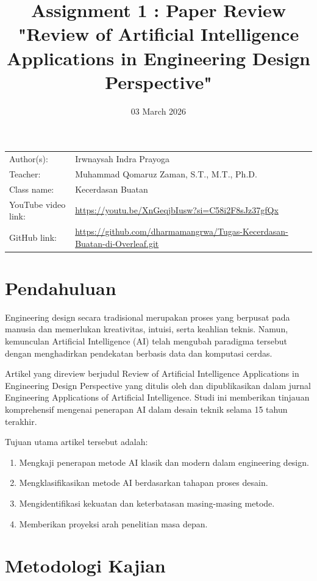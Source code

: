 \documentclass{article}
\title{Assignment 1 : Paper Review "Review of Artificial Intelligence Applications in Engineering Design Perspective"}
\date{03 March 2026}
\begin{document}
\maketitle


\noindent\begin{tabular}{@{}ll}
    Author(s): & Irwnaysah Indra Prayoga\\
     Teacher: &  Muhammad Qomaruz Zaman, S.T., M.T., Ph.D.\\
     Class name: & Kecerdasan Buatan\\
     YouTube video link: & \url{https://youtu.be/XnGeqjbIusw?si=C58i2F8sJz37gfQx} \\
     GitHub link: & \url{https://github.com/dharmamangrwa/Tugas-Kecerdasan-Buatan-di-Overleaf.git}
\end{tabular}
\vspace{2cm}

\section*{Pendahuluan}

Engineering design secara tradisional merupakan proses yang berpusat pada manusia dan memerlukan kreativitas, intuisi, serta keahlian teknis. Namun, kemunculan Artificial Intelligence (AI) telah mengubah paradigma tersebut dengan menghadirkan pendekatan berbasis data dan komputasi cerdas.

Artikel yang direview berjudul Review of Artificial Intelligence Applications in Engineering Design Perspective yang ditulis oleh \cite{yuksel2023artificial} dan dipublikasikan dalam jurnal Engineering Applications of Artificial Intelligence. Studi ini memberikan tinjauan komprehensif mengenai penerapan AI dalam desain teknik selama 15 tahun terakhir.

Tujuan utama artikel tersebut adalah: \begin{enumerate}

\item Mengkaji penerapan metode AI klasik dan modern dalam engineering design.
\item Mengklasifikasikan metode AI berdasarkan tahapan proses desain.
\item Mengidentifikasi kekuatan dan keterbatasan masing-masing metode.
\item Memberikan proyeksi arah penelitian masa depan.
\end{enumerate}

\section*{Metodologi Kajian}
\end{document}

